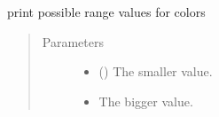 \documentclass[a4paper,10pt,english]{sphinxmanual}
\begin{document}
\begin{fulllineitems}
\label{\detokenize{commands/apidoc/src:src.printcolors.print_color_range}}
print possible range values for colors
\begin{quote}\begin{description}
\item[{Parameters}] \leavevmode\begin{itemize}
\item {} 
 () \textendash{} The smaller value.

\item {} 
 \textendash{} The bigger value.

\end{itemize}

\end{description}\end{quote}

\end{fulllineitems}

\end{document}
